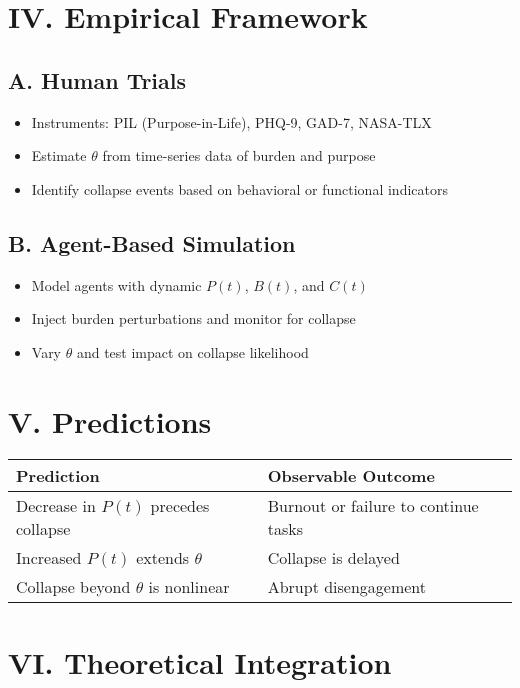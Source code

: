 \documentclass[12pt]{article}
\begin{document}
\section*{IV. Empirical Framework}

\subsection*{A. Human Trials}
\begin{itemize}
  \item Instruments: PIL (Purpose-in-Life), PHQ-9, GAD-7, NASA-TLX
  \item Estimate \( \theta \) from time-series data of burden and purpose
  \item Identify collapse events based on behavioral or functional indicators
\end{itemize}

\subsection*{B. Agent-Based Simulation}
\begin{itemize}
  \item Model agents with dynamic \( P(t) \), \( B(t) \), and \( C(t) \)
  \item Inject burden perturbations and monitor for collapse
  \item Vary \( \theta \) and test impact on collapse likelihood
\end{itemize}

\section*{V. Predictions}

\begin{tabular}{ll}
\textbf{Prediction} & \textbf{Observable Outcome} \\
\hline
Decrease in \( P(t) \) precedes collapse & Burnout or failure to continue tasks \\
Increased \( P(t) \) extends \( \theta \) & Collapse is delayed \\
Collapse beyond \( \theta \) is nonlinear & Abrupt disengagement \\
\end{tabular}

\section*{VI. Theoretical Integration}
\end{document}
